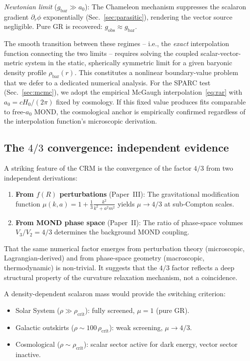 \documentclass[aps,prd,twocolumn,superscriptaddress,nofootinbib]{revtex4-2}
\begin{document}
\textit{Newtonian limit} ($g_{\mathrm{bar}} \gg a_0$): The Chameleon mechanism suppresses the scalaron gradient $\partial_r\phi$ exponentially (Sec.~\ref{sec:parasitic}), rendering the vector source negligible. Pure GR is recovered: $g_{\mathrm{obs}} \approx g_{\mathrm{bar}}$.

The smooth transition between these regimes -- i.e., the \textit{exact} interpolation function connecting the two limits -- requires solving the coupled scalar-vector-metric system in the static, spherically symmetric limit for a given baryonic density profile $\rho_{\mathrm{bar}}(r)$. This constitutes a nonlinear boundary-value problem that we defer to a dedicated numerical analysis. For the SPARC test (Sec.~\ref{sec:mcmc}), we adopt the empirical McGaugh interpolation~\eqref{eq:rar} with $a_0 = cH_0/(2\pi)$ fixed by cosmology. If this fixed value produces fits comparable to free-$a_0$ MOND, the cosmological anchor is empirically confirmed regardless of the interpolation function's microscopic derivation.

\subsection{The $4/3$ convergence: independent evidence}
\label{sec:four_thirds}

A striking feature of the CRM is the convergence of the factor $4/3$ from two independent derivations:

\begin{enumerate}
\item \textbf{From $f(R)$ perturbations} (Paper~III): The gravitational modification function $\mu(k,a) = 1 + \frac{1}{3}\frac{k^2}{k^2 + a^2 m^2}$ yields $\mu \to 4/3$ at sub-Compton scales.

\item \textbf{From MOND phase space} (Paper~II): The ratio of phase-space volumes $V_3/V_2 = 4/3$ determines the background MOND coupling.
\end{enumerate}

That the same numerical factor emerges from perturbation theory (microscopic, Lagrangian-derived) and from phase-space geometry (macroscopic, thermodynamic) is non-trivial. It suggests that the $4/3$ factor reflects a deep structural property of the curvature relaxation mechanism, not a coincidence.

A density-dependent scalaron mass would provide the switching criterion:
\begin{itemize}
\item Solar System ($\rho \gg \rho_{\mathrm{crit}}$): fully screened, $\mu = 1$ (pure GR).
\item Galactic outskirts ($\rho \sim 100\,\rho_{\mathrm{crit}}$): weak screening, $\mu \to 4/3$.
\item Cosmological ($\rho \sim \rho_{\mathrm{crit}}$): scalar sector active for dark energy, vector sector inactive.
\end{itemize}
\end{document}
